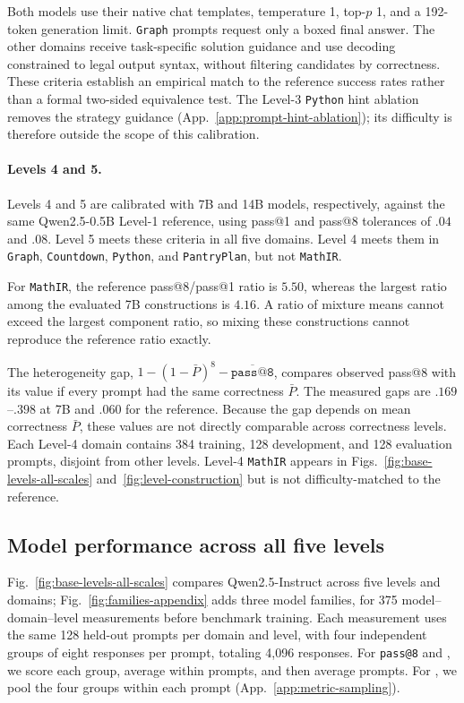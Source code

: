 Both models use their native chat templates, temperature 1, top-$p$ 1, and a
192-token generation limit. \texttt{Graph} prompts request only a boxed final
answer. The other domains receive task-specific solution guidance and use
decoding constrained to legal output syntax, without filtering candidates by
correctness. These criteria establish an empirical match to the reference
success rates rather than a formal two-sided equivalence test.
The Level-3 \texttt{Python} hint ablation removes the strategy guidance
(App.~\ref{app:prompt-hint-ablation}); its difficulty is therefore outside
the scope of this calibration.

\paragraph{Levels 4 and 5.}
Levels 4 and 5 are calibrated with 7B and 14B models, respectively, against
the same Qwen2.5-0.5B Level-1 reference, using pass@1 and pass@8 tolerances
of $.04$ and $.08$.
Level 5 meets these criteria in all five domains. Level 4 meets them in \texttt{Graph},
\texttt{Countdown}, \texttt{Python}, and \texttt{PantryPlan}, but not \texttt{MathIR}.

For \texttt{MathIR}, the reference pass@8/pass@1 ratio is $5.50$, whereas
the largest ratio among the evaluated 7B constructions is $4.16$. A ratio
of mixture means cannot exceed the largest component ratio, so mixing these
constructions cannot reproduce the reference ratio exactly.

The heterogeneity gap, $1-(1-\bar P)^8-\overline{\texttt{pass@8}}$, compares
observed pass@8 with its value if every prompt had the same correctness
$\bar P$. The measured gaps are $.169$--$.398$ at 7B and $.060$ for the
reference. Because the gap depends on mean correctness $\bar P$, these values
are not directly comparable across correctness levels. Each Level-4 domain
contains 384 training, 128 development, and 128 evaluation prompts, disjoint
from other levels. Level-4 \texttt{MathIR} appears in
Figs.~\ref{fig:base-levels-all-scales} and~\ref{fig:level-construction}
but is not difficulty-matched to the reference.

\subsection{Model performance across all five levels}
\label{app:base-levels-all-scales}

Fig.~\ref{fig:base-levels-all-scales} compares Qwen2.5-Instruct across five
levels and domains; Fig.~\ref{fig:families-appendix} adds three model families,
for 375 model--domain--level measurements before benchmark training.
Each measurement uses the same 128 held-out prompts per domain and level,
with four independent groups of eight responses per prompt, totaling 4,096
responses. For \texttt{pass@8} and \distk{}, we score each group, average
within prompts, and then average prompts. For \pmd{}, we pool the four
groups within each prompt (App.~\ref{app:metric-sampling}).

